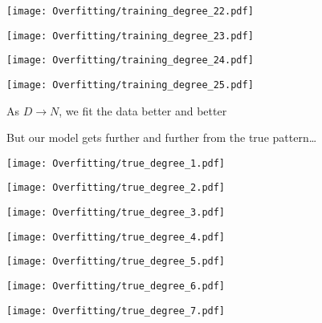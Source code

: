 \documentclass[xcolor=pdftex,dvipsnames,table]{beamer}
\begin{document}
\frame
{
	\begin{center}
		\texttt{[image: Overfitting/training\_degree\_22.pdf]}
	\end{center}
}

\frame
{
	\begin{center}
		\texttt{[image: Overfitting/training\_degree\_23.pdf]}
	\end{center}
}

\frame
{
	\begin{center}
		\texttt{[image: Overfitting/training\_degree\_24.pdf]}
	\end{center}
}

\frame
{
	\begin{center}
		\texttt{[image: Overfitting/training\_degree\_25.pdf]}
	\end{center}
}

\frame
{
	As $D \to N$, we fit the data better and better
}

\frame
{
	But our model gets further and further from the true pattern\ldots
}

\frame
{
	\begin{center}
		\texttt{[image: Overfitting/true\_degree\_1.pdf]}
	\end{center}
}

\frame
{
	\begin{center}
		\texttt{[image: Overfitting/true\_degree\_2.pdf]}
	\end{center}
}

\frame
{
	\begin{center}
		\texttt{[image: Overfitting/true\_degree\_3.pdf]}
	\end{center}
}

\frame
{
	\begin{center}
		\texttt{[image: Overfitting/true\_degree\_4.pdf]}
	\end{center}
}

\frame
{
	\begin{center}
		\texttt{[image: Overfitting/true\_degree\_5.pdf]}
	\end{center}
}

\frame
{
	\begin{center}
		\texttt{[image: Overfitting/true\_degree\_6.pdf]}
	\end{center}
}

\frame
{
	\begin{center}
		\texttt{[image: Overfitting/true\_degree\_7.pdf]}
	\end{center}
}
\end{document}
